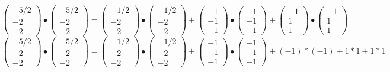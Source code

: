 \documentclass[11pt]{article}
\begin{document}
\begin{equation*}
\begin{pmatrix}
-5/2\\
-2\\
-2
\end{pmatrix}
\bullet
\begin{pmatrix}
-5/2\\
-2\\
-2
\end{pmatrix}
=
\begin{pmatrix}
-1/2 \\
-2\\
-2
\end{pmatrix}
\bullet
\begin{pmatrix}
-1/2 \\
-2\\
-2
\end{pmatrix}
+
\begin{pmatrix}
-1 \\
-1\\
-1
\end{pmatrix}
\bullet
\begin{pmatrix}
-1 \\
-1\\
-1
\end{pmatrix}
+
\begin{pmatrix}
-1 \\
1\\
1
\end{pmatrix}
\bullet
\begin{pmatrix}
-1 \\
1\\
1
\end{pmatrix}
\end{equation*}
\begin{equation*}
\begin{pmatrix}
-5/2\\
-2\\
-2
\end{pmatrix}
\bullet
\begin{pmatrix}
-5/2\\
-2\\
-2
\end{pmatrix}
=
\begin{pmatrix}
-1/2 \\
-2\\
-2
\end{pmatrix}
\bullet
\begin{pmatrix}
-1/2 \\
-2\\
-2
\end{pmatrix}
+
\begin{pmatrix}
-1 \\
-1\\
-1
\end{pmatrix}
\bullet
\begin{pmatrix}
-1 \\
-1\\
-1
\end{pmatrix}
+ (-1)*(-1) + 1*1 + 1*1
\end{equation*}
\end{document}
